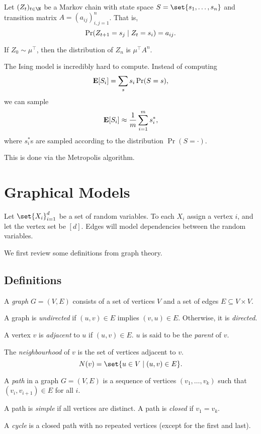 Let $(Z_t)_{t \in \N}$ be a Markov chain with state space
$S = \set{s_1, \dots, s_n}$ and transition matrix
$A = (a_{ij})_{i,j=1}^n$.
That is, \[
    \Pr(Z_{t+1} = s_j \mid Z_t = s_i) = a_{ij}.
\]

If $Z_0 \sim \mu^\top$, then the distribution of $Z_n$ is $\mu^\top A^n$.

The Ising model is incredibly hard to compute.
Instead of computing \[
    \operatorname*{\textbf{E}}[S_i] = \sum_s s_i \Pr(S = s),
\] we can sample \[
    \operatorname*{\textbf{E}}[S_i] \approx \frac1m \sum_{i=1}^m s_i^*,
\] where $s_i^*$s are sampled according to the distribution
$\Pr(S = \cdot)$.

This is done via the Metropolis algorithm.

\chapter{Graphical Models} \label{chp:graph_models}
Let $\set{X_i}_{i=1}^d$ be a set of random variables.
To each $X_i$ assign a vertex $i$, and let the vertex set be $[d]$.
Edges will model dependencies between the random variables.

We first review some definitions from graph theory.
\section{Definitions} \label{sec:graph_def}
\begin{definition}
    A \emph{graph} $G = (V, E)$ consists of a set of vertices $V$
    and a set of edges $E \subseteq V \times V$.

    A graph is \emph{undirected} if $(u, v) \in E$ implies $(v, u) \in E$.
    Otherwise, it is \emph{directed}.

    A vertex $v$ is \emph{adjacent} to $u$ if $(u, v) \in E$.
    $u$ is said to be the \emph{parent} of $v$.

    The \emph{neighbourhood} of $v$ is the set of vertices adjacent to $v$.
    \[
        N(v) = \set{u \in V \given (u, v) \in E}.
    \]
\end{definition}

\begin{definition}[Paths] \label{def:graph:paths}
    A \emph{path} in a graph $G = (V, E)$ is a sequence of vertices
    $(v_1, \dots, v_k)$ such that $(v_i, v_{i+1}) \in E$ for all $i$.

    A path is \emph{simple} if all vertices are distinct.
    A path is \emph{closed} if $v_1 = v_k$.

    A \emph{cycle} is a closed path with no repeated vertices (except
    for the first and last).
\end{definition}

